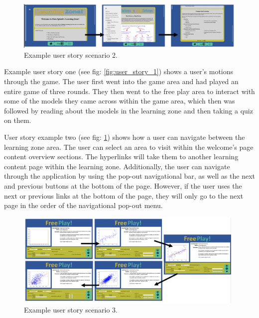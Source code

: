 	\begin{figure}[t]
		\begin{center}
			\includegraphics[width=13cm]{graphics/lz_us_example.png}
			\caption{Example user story scenario 2.}
			\label{fig:user_story_2}
		\end{center}
	\end{figure}
	
	
	Example user story one (see fig: \ref{fig:user_story_1}) shows a user's motions through the game. The user first went into the game area and had played an entire game of three rounds. They then went to the free play area to interact with some of the models they came across within the game area, which then was followed by reading about the models in the learning zone and then taking a quiz on them.
	
	
	User story example two (see fig: \ref{fig:user_story_2}) shows how a user can navigate between the learning zone area. The user can select an area to visit within the welcome's page content overview sections. The hyperlinks will take them to another learning content page within the learning zone. Additionally, the user can navigate through the application by using the pop-out navigational bar, as well as the next and previous buttons at the bottom of the page. However, if the user uses the next or previous links at the bottom of the page, they will only go to the next page in the order of the navigational pop-out menu.
	
	\begin{figure}[b]
		\begin{center}
			\includegraphics[width=11cm]{graphics/fp_us_example.png}
			\caption{Example user story scenario 3.}
			\label{fig:user_story_3}
		\end{center}
	\end{figure}

